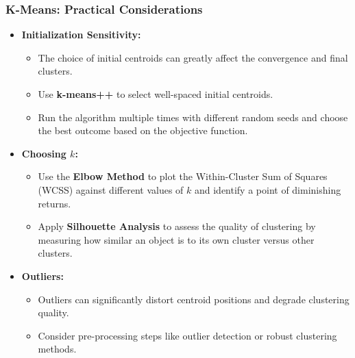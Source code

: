 \documentclass[aspectratio=169]{beamer}
\begin{document}
    \begin{frame}
        \frametitle{K-Means: Practical Considerations}
        \begin{itemize}
            \item \textbf{Initialization Sensitivity:}
                \begin{itemize}
                    \item The choice of initial centroids can greatly affect the convergence and final clusters.
                    \item Use \textbf{k-means++} to select well-spaced initial centroids.
                    \item Run the algorithm multiple times with different random seeds and choose the best outcome based on the objective function.
                \end{itemize}
            \item \textbf{Choosing \(k\):}
                \begin{itemize}
                    \item Use the \textbf{Elbow Method} to plot the Within-Cluster Sum of Squares (WCSS) against different values of \(k\) and identify a point of diminishing returns.
                    \item Apply \textbf{Silhouette Analysis} to assess the quality of clustering by measuring how similar an object is to its own cluster versus other clusters.
                \end{itemize}
            \item \textbf{Outliers:}
                \begin{itemize}
                    \item Outliers can significantly distort centroid positions and degrade clustering quality.
                    \item Consider pre-processing steps like outlier detection or robust clustering methods.
                \end{itemize}
        \end{itemize}
        \end{frame}
        
\end{document}
